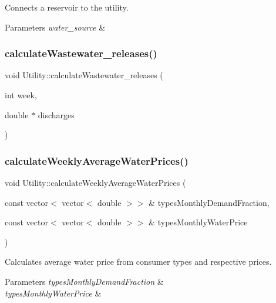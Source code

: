 Connects a reservoir to the utility. 
\begin{DoxyParams}{Parameters}
{\em water\+\_\+source} & \\
\hline
\end{DoxyParams}
\mbox{\label{classUtility_a5feecc73d561de022eb6ba3c657b3dbc_a5feecc73d561de022eb6ba3c657b3dbc}} 
\subsubsection{\texorpdfstring{calculate\+Wastewater\+\_\+releases()}{calculateWastewater\_releases()}}
{\footnotesize\ttfamily void Utility\+::calculate\+Wastewater\+\_\+releases (\begin{DoxyParamCaption}\item[{int}]{week,  }\item[{double $\ast$}]{discharges }\end{DoxyParamCaption})}

\mbox{\label{classUtility_a0189edb631c9596f094b15afeeb934fd_a0189edb631c9596f094b15afeeb934fd}} 
\subsubsection{\texorpdfstring{calculate\+Weekly\+Average\+Water\+Prices()}{calculateWeeklyAverageWaterPrices()}}
{\footnotesize\ttfamily void Utility\+::calculate\+Weekly\+Average\+Water\+Prices (\begin{DoxyParamCaption}\item[{const vector$<$ vector$<$ double $>$$>$ \&}]{types\+Monthly\+Demand\+Fraction,  }\item[{const vector$<$ vector$<$ double $>$$>$ \&}]{types\+Monthly\+Water\+Price }\end{DoxyParamCaption})}

Calculates average water price from consumer types and respective prices. 
\begin{DoxyParams}{Parameters}
{\em types\+Monthly\+Demand\+Fraction} & \\
\hline
{\em types\+Monthly\+Water\+Price} & \\
\hline
\end{DoxyParams}
\mbox{\label{classUtility_a7e1a1362011b8b57d68fb69f17d773ae_a7e1a1362011b8b57d68fb69f17d773ae}} 
